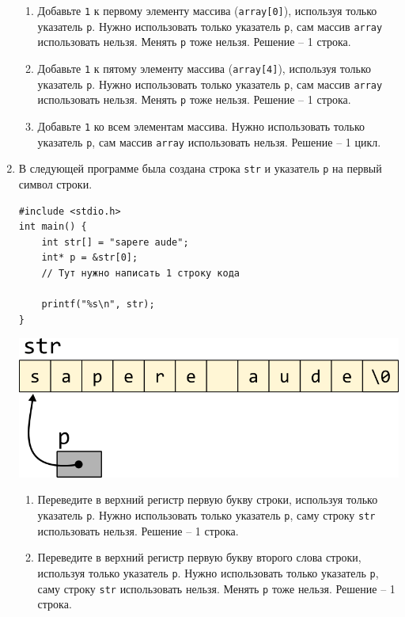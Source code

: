 \documentclass{article}
\begin{document}
\begin{enumerate}
\begin{enumerate}
\item Добавьте \texttt{1} к первому элементу массива (\texttt{array[0]}), используя только указатель \texttt{p}. Нужно использовать только указатель \texttt{p}, сам массив \texttt{array} использовать нельзя. Менять \texttt{p} тоже нельзя. Решение -- 1 строка.
\item Добавьте \texttt{1} к пятому элементу массива (\texttt{array[4]}), используя только указатель \texttt{p}. Нужно использовать только указатель \texttt{p}, сам массив \texttt{array} использовать нельзя. Менять \texttt{p} тоже нельзя. Решение -- 1 строка.
\item Добавьте \texttt{1} ко всем элементам массива. Нужно использовать только указатель \texttt{p}, сам массив \texttt{array} использовать нельзя. Решение -- 1 цикл.
\end{enumerate}



\newpage
\item В следующей программе была создана строка \texttt{str} и указатель \texttt{p} на первый символ строки. 
\begin{multicols}{2}
\begin{lstlisting}
#include <stdio.h>
int main() {
    int str[] = "sapere aude";
    int* p = &str[0];
    // Тут нужно написать 1 строку кода
    
    printf("%s\n", str);
}
\end{lstlisting}
\vfill \null    
\columnbreak
\vfill \null 
\begin{center}
\vspace{1cm} 
\includegraphics[scale=0.8]{../images/pointer_schemes/pointer_to_char_array.png}
\end{center}
\end{multicols}

\begin{enumerate}
\item Переведите в верхний регистр первую букву строки, используя только указатель \texttt{p}. Нужно использовать только указатель \texttt{p}, саму строку \texttt{str} использовать нельзя. Решение -- 1 строка.
\item Переведите в верхний регистр первую букву второго слова строки, используя только указатель \texttt{p}. Нужно использовать только указатель \texttt{p}, саму строку \texttt{str} использовать нельзя. Менять \texttt{p} тоже нельзя. Решение -- 1 строка.


\end{enumerate}
\end{enumerate}
\end{document}
